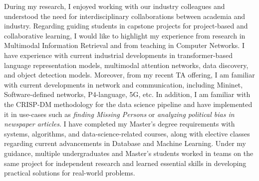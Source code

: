 \documentclass[10pt]{article}
\renewcommand*\paragraph[1]{}
\begin{document}
\paragraph{P3) Relevant industrial experience beneficial to CS/ DS curriculum development and CS/DS capstone project advising}

During my research, I enjoyed working with our industry colleagues and understood the need for interdisciplinary collaborations between academia and industry.
Regarding guiding students in capstone projects for project-based and collaborative learning, I would like to highlight my experience from research in Multimodal Information Retrieval and from teaching in Computer Networks. I have experience with current industrial developments in transformer-based language representation models, multimodal attention networks, data discovery, and object detection models. Moreover, from my recent TA offering, I am familiar with current developments in network and communication, including Mininet, Software-defined networks, P4-language, 5G, etc. In addition, I am familiar with the CRISP-DM methodology for the data science pipeline and have implemented it in use-cases such as \textit{finding Missing Persons} or \textit{analyzing political bias in newspaper articles}. 
I have completed my Master's degree requirements with systems, algorithms, and data-science-related courses, along with elective classes regarding current advancements in Database and Machine Learning. 
Under my guidance, multiple undergraduates and Master's students worked in teams on the same project for independent research and learned essential skills in developing practical solutions for real-world problems.  


\end{document}
